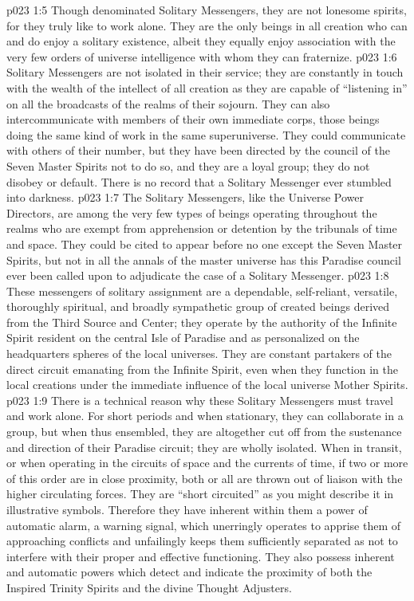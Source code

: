 \vs p023 1:5 Though denominated Solitary Messengers, they are not lonesome spirits, for they truly like to work alone. They are the only beings in all creation who can and do enjoy a solitary existence, albeit they equally enjoy association with the very few orders of universe intelligence with whom they can fraternize.
\pc \vs p023 1:6 Solitary Messengers are not isolated in their service; they are constantly in touch with the wealth of the intellect of all creation as they are capable of “listening in” on all the broadcasts of the realms of their sojourn. They can also intercommunicate with members of their own immediate corps, those beings doing the same kind of work in the same superuniverse. They could communicate with others of their number, but they have been directed by the council of the Seven Master Spirits not to do so, and they are a loyal group; they do not disobey or default. There is no record that a Solitary Messenger ever stumbled into darkness.
\vs p023 1:7 The Solitary Messengers, like the Universe Power Directors, are among the very few types of beings operating throughout the realms who are exempt from apprehension or detention by the tribunals of time and space. They could be cited to appear before no one except the Seven Master Spirits, but not in all the annals of the master universe has this Paradise council ever been called upon to adjudicate the case of a Solitary Messenger.
\vs p023 1:8 These messengers of solitary assignment are a dependable, self\hyp{}reliant, versatile, thoroughly spiritual, and broadly sympathetic group of created beings derived from the Third Source and Center; they operate by the authority of the Infinite Spirit resident on the central Isle of Paradise and as personalized on the headquarters spheres of the local universes. They are constant partakers of the direct circuit emanating from the Infinite Spirit, even when they function in the local creations under the immediate influence of the local universe Mother Spirits.\plusone
\pc \vs p023 1:9 There is a technical reason why these Solitary Messengers must travel and work alone. For short periods and when stationary, they can collaborate in a group, but when thus ensembled, they are altogether cut off from the sustenance and direction of their Paradise circuit; they are wholly isolated. When in transit, or when operating in the circuits of space and the currents of time, if two or more of this order are in close proximity, both or all are thrown out of liaison with the higher circulating forces. They are “short circuited” as you might describe it in illustrative symbols. Therefore they have inherent within them a power of automatic alarm, a warning signal, which unerringly operates to apprise them of approaching conflicts and unfailingly keeps them sufficiently separated as not to interfere with their proper and effective functioning. They also possess inherent and automatic powers which detect and indicate the proximity of both the Inspired Trinity Spirits and the divine Thought Adjusters.
